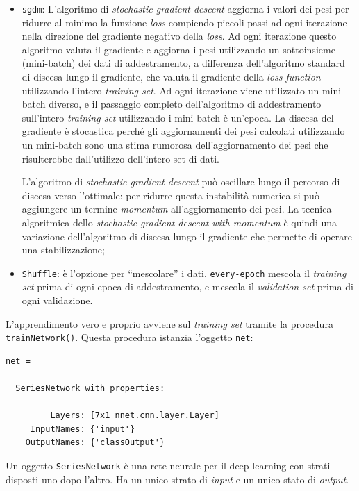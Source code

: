 \documentclass[a4paper,12pt]{article}
\begin{document}
\begin{itemize}
    \item \texttt{sgdm}: L'algoritmo di \emph{stochastic gradient descent} aggiorna i valori dei pesi per ridurre al minimo la funzione \emph{loss} compiendo piccoli passi ad ogni iterazione nella direzione del gradiente negativo della \emph{loss}. Ad ogni iterazione questo algoritmo valuta il gradiente e aggiorna i pesi utilizzando un sottoinsieme (mini-batch) dei dati di addestramento, a differenza dell'algoritmo standard di discesa lungo il gradiente, che valuta il gradiente della \emph{loss function} utilizzando l'intero \emph{training set}. Ad ogni iterazione viene utilizzato un mini-batch diverso, e il passaggio completo dell'algoritmo di addestramento sull'intero \emph{training set} utilizzando i mini-batch è un'epoca. La discesa del gradiente è stocastica perché gli aggiornamenti dei pesi calcolati utilizzando un mini-batch sono una stima rumorosa dell'aggiornamento dei pesi che risulterebbe dall'utilizzo dell'intero set di dati. 
    
    L'algoritmo di \emph{stochastic gradient descent} può oscillare lungo il percorso di discesa verso l'ottimale: per ridurre questa instabilità numerica si può aggiungere un termine \emph{momentum} all'aggiornamento dei pesi. La tecnica algoritmica dello \emph{stochastic gradient descent with momentum} è quindi una variazione dell'algoritmo di discesa lungo il gradiente che permette di operare una stabilizzazione;
    \item \texttt{Shuffle}: è l'opzione per ``mescolare'' i dati. \texttt{every-epoch} mescola il \emph{training set} prima di ogni epoca di addestramento, e mescola il \emph{validation set} prima di ogni validazione.
\end{itemize}

L'apprendimento vero e proprio avviene sul \emph{training set} tramite la procedura \texttt{tra\-in\-Net\-work()}. Questa procedura istanzia l'oggetto \texttt{net}:

\begin{lstlisting}[style=Matlab-editor,label=lst:net]
net = 

  SeriesNetwork with properties:

         Layers: [7x1 nnet.cnn.layer.Layer]
     InputNames: {'input'}
    OutputNames: {'classOutput'}
\end{lstlisting}

Un oggetto \texttt{SeriesNetwork} è una rete neurale per il deep learning con strati disposti uno dopo l'altro. Ha un unico strato di \emph{input} e un unico stato di \emph{output}.\medskip
\end{document}
